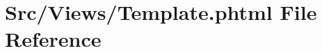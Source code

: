 \hypertarget{_template_8phtml}{}\section{Src/\+Views/\+Template.phtml File Reference}
\label{_template_8phtml}

